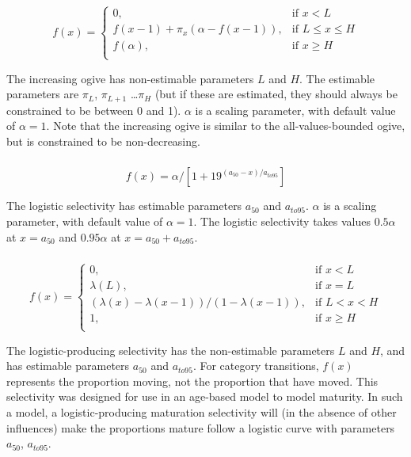 \begin{equation} 
f(x)=\begin{cases}
	  0, & \text{if $x < L$} \\
	  f(x-1)+ \pi_x(\alpha-f(x-1)), & \text{if $L \le x \le H$} \\
	  f(\alpha), & \text{if $x \ge H$} \\  
  \end{cases}
\end{equation}

The increasing ogive has non-estimable parameters $L$ and $H$. The estimable parameters are $\pi_L$, $\pi_{L+1}$ \ldots $\pi_H$ (but if these are estimated, they should always be constrained to be between 0 and 1). $\alpha$ is a scaling parameter, with default value of $\alpha = 1$. Note that the increasing ogive is similar to the all-values-bounded ogive, but is constrained to be non-decreasing.

\subsubsection[Logistic]{}

\begin{equation}
  f(x) = \alpha / [1+19^{(a_{50}-x)/a_{to95}}]
\end{equation}
 
The logistic selectivity has estimable parameters $a_{50}$ and $a_{to95}$. $\alpha$ is a scaling parameter, with default value of $\alpha = 1$. The logistic selectivity takes values $0.5 \alpha$ at $x=a_{50}$ and $0.95 \alpha$ at $x=a_{50}+a_{to95}$. 

\subsubsection[Logistic producing]{}

\begin{equation} 
f(x)=\begin{cases}
	  0, & \text{if $x < L$} \\
	  \lambda(L), & \text{if $x=L$} \\
	  \left( \lambda(x)-\lambda(x-1) \right) / \left( 1-\lambda(x-1) \right), & \text{if $L < x < H$} \\
	  1, & \text{if $x \ge H$} \\  
  \end{cases}
\end{equation}

The logistic-producing selectivity has the non-estimable parameters $L$ and $H$, and has estimable parameters $a_{50}$ and $a_{to95}$. For category transitions, $f(x)$ represents the proportion moving, not the proportion that have moved. This selectivity was designed for use in an age-based model to model maturity. In such a model, a logistic-producing maturation selectivity will (in the absence of other influences) make the proportions mature follow a logistic curve with parameters $a_{50}$, $a_{to95}$.

